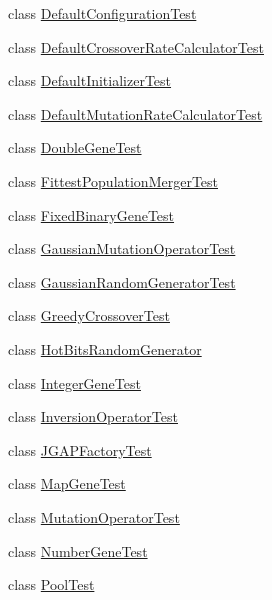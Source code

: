 \begin{DoxyCompactItemize}
\item 
class \hyperlink{classorg_1_1jgap_1_1impl_1_1_default_configuration_test}{Default\-Configuration\-Test}
\item 
class \hyperlink{classorg_1_1jgap_1_1impl_1_1_default_crossover_rate_calculator_test}{Default\-Crossover\-Rate\-Calculator\-Test}
\item 
class \hyperlink{classorg_1_1jgap_1_1impl_1_1_default_initializer_test}{Default\-Initializer\-Test}
\item 
class \hyperlink{classorg_1_1jgap_1_1impl_1_1_default_mutation_rate_calculator_test}{Default\-Mutation\-Rate\-Calculator\-Test}
\item 
class \hyperlink{classorg_1_1jgap_1_1impl_1_1_double_gene_test}{Double\-Gene\-Test}
\item 
class \hyperlink{classorg_1_1jgap_1_1impl_1_1_fittest_population_merger_test}{Fittest\-Population\-Merger\-Test}
\item 
class \hyperlink{classorg_1_1jgap_1_1impl_1_1_fixed_binary_gene_test}{Fixed\-Binary\-Gene\-Test}
\item 
class \hyperlink{classorg_1_1jgap_1_1impl_1_1_gaussian_mutation_operator_test}{Gaussian\-Mutation\-Operator\-Test}
\item 
class \hyperlink{classorg_1_1jgap_1_1impl_1_1_gaussian_random_generator_test}{Gaussian\-Random\-Generator\-Test}
\item 
class \hyperlink{classorg_1_1jgap_1_1impl_1_1_greedy_crossover_test}{Greedy\-Crossover\-Test}
\item 
class \hyperlink{classorg_1_1jgap_1_1impl_1_1_hot_bits_random_generator}{Hot\-Bits\-Random\-Generator}
\item 
class \hyperlink{classorg_1_1jgap_1_1impl_1_1_integer_gene_test}{Integer\-Gene\-Test}
\item 
class \hyperlink{classorg_1_1jgap_1_1impl_1_1_inversion_operator_test}{Inversion\-Operator\-Test}
\item 
class \hyperlink{classorg_1_1jgap_1_1impl_1_1_j_g_a_p_factory_test}{J\-G\-A\-P\-Factory\-Test}
\item 
class \hyperlink{classorg_1_1jgap_1_1impl_1_1_map_gene_test}{Map\-Gene\-Test}
\item 
class \hyperlink{classorg_1_1jgap_1_1impl_1_1_mutation_operator_test}{Mutation\-Operator\-Test}
\item 
class \hyperlink{classorg_1_1jgap_1_1impl_1_1_number_gene_test}{Number\-Gene\-Test}
\item 
class \hyperlink{classorg_1_1jgap_1_1impl_1_1_pool_test}{Pool\-Test}

\end{DoxyCompactItemize}
